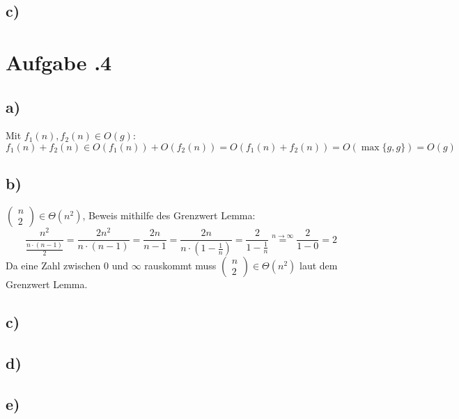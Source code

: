 \documentclass[12pt,german,a4paper]{article}
\begin{document}
	\subsection*{c)}
	
  \newpage
	\section*{Aufgabe \bn.4}
	\subsection*{a)}
	Mit $f_1(n),f_2(n)\in O(g)$:
	$$ f_1(n)+f_2(n) \in O(f_1(n)) + O(f_2(n))=O(f_1(n)+f_2(n))=O(\max\{g,g\})=O(g)$$
	\subsection*{b)}
	$\begin{pmatrix}n\\2\end{pmatrix}\in\Theta(n^2)$, Beweis mithilfe des Grenzwert Lemma:
	$$
	\frac{ n^2 }{ \frac{ n\cdot(n-1) }{ 2 } } = \frac{ 2n^2 }{ n\cdot(n-1) } =\frac{ 2n }{ n-1 } =\frac{ 2n }{ n\cdot(1-\frac{ 1 }{ n } ) } =\frac{ 2 }{ 1-\frac{ 1 }{ n }  } \overset{n \rightarrow \infty}{=} \frac{ 2 }{ 1-0 } = 2
	$$
	Da eine Zahl zwischen 0 und $\infty$ rauskommt muss $\begin{pmatrix}n\\2\end{pmatrix}\in\Theta(n^2)$ laut dem Grenzwert Lemma.
	\subsection*{c)}
	\subsection*{d)}
	\subsection*{e)}
	
\end{document}
